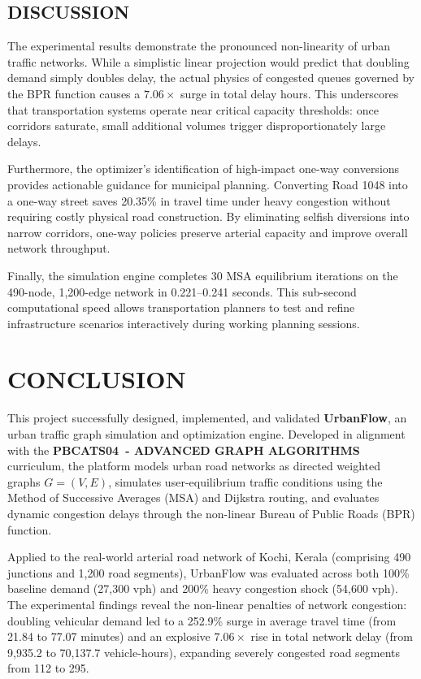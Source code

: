\documentclass[12pt,a4paper]{report}
\newcommand{\coursecode}{PBCATS04}
\newcommand{\coursename}{ADVANCED GRAPH ALGORITHMS}
\begin{document}
\section{DISCUSSION}
The experimental results demonstrate the pronounced non-linearity of urban traffic networks. While a simplistic linear projection would predict that doubling demand simply doubles delay, the actual physics of congested queues governed by the BPR function causes a $7.06\times$ surge in total delay hours. This underscores that transportation systems operate near critical capacity thresholds: once corridors saturate, small additional volumes trigger disproportionately large delays.

Furthermore, the optimizer's identification of high-impact one-way conversions provides actionable guidance for municipal planning. Converting Road 1048 into a one-way street saves 20.35\% in travel time under heavy congestion without requiring costly physical road construction. By eliminating selfish diversions into narrow corridors, one-way policies preserve arterial capacity and improve overall network throughput.

Finally, the simulation engine completes 30 MSA equilibrium iterations on the 490-node, 1,200-edge network in 0.221--0.241 seconds. This sub-second computational speed allows transportation planners to test and refine infrastructure scenarios interactively during working planning sessions.

\chapter{CONCLUSION}
\label{chap:conclusion}
This project successfully designed, implemented, and validated \textbf{UrbanFlow}, an urban traffic graph simulation and optimization engine. Developed in alignment with the \textbf{\coursecode\ - \coursename} curriculum, the platform models urban road networks as directed weighted graphs $G = (V, E)$, simulates user-equilibrium traffic conditions using the Method of Successive Averages (MSA) and Dijkstra routing, and evaluates dynamic congestion delays through the non-linear Bureau of Public Roads (BPR) function.

Applied to the real-world arterial road network of Kochi, Kerala (comprising 490 junctions and 1,200 road segments), UrbanFlow was evaluated across both 100\% baseline demand (27,300 vph) and 200\% heavy congestion shock (54,600 vph). The experimental findings reveal the non-linear penalties of network congestion: doubling vehicular demand led to a 252.9\% surge in average travel time (from 21.84 to 77.07 minutes) and an explosive $7.06\times$ rise in total network delay (from 9,935.2 to 70,137.7 vehicle-hours), expanding severely congested road segments from 112 to 295.
\end{document}
